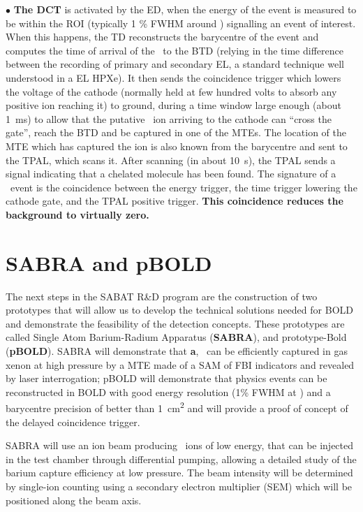 \documentclass[a4paper,11pt]{article}
\begin{document}
$\bullet$ \textbf{The DCT} is activated by the ED, when the energy of the event is measured to be within the ROI (typically 1 \% FWHM around \Qbb) signalling an event of interest. When this happens, the TD reconstructs the barycentre of the event and computes the time of arrival of the \Bapp\ to the BTD (relying in the time difference between the recording of primary and secondary EL, a standard technique well understood in a EL HPXe). It then sends the coincidence trigger which lowers the voltage of the cathode (normally held at few hundred volts to absorb any positive ion reaching it) to ground, during a time window large enough (about \SI{1}{ms}) to allow that the putative \Bapp\ ion arriving to the cathode can ``cross the gate'', reach the BTD and be captured in one of the MTEs. The location of the MTE which has captured the ion is also known from the barycentre and sent to the TPAL, which scans it. After scanning (in about 
\SI{10}{\second}), the TPAL sends a signal indicating that a chelated molecule has been found. The signature of a \bbonu\ event is the coincidence between the energy trigger, the time trigger lowering the cathode gate, and the TPAL positive trigger.  {\bf This coincidence reduces the background to virtually zero. }

\section{SABRA and pBOLD}


The next steps in the SABAT R\&D program are the construction of two prototypes that will allow us to develop the technical solutions needed for BOLD and demonstrate the feasibility of the detection concepts. These prototypes are called Single Atom Barium-Radium Apparatus (\textbf{SABRA}), and prototype-Bold (\textbf{pBOLD}). SABRA will demonstrate that \textbf{a}, \Bapp\ can be efficiently captured in gas xenon at high pressure by a MTE made of a SAM of FBI indicators and revealed by laser interrogation; pBOLD will demonstrate that physics events can be reconstructed in BOLD with good energy resolution (1\% FWHM at \Qbb) and a barycentre precision of better than \SI{1}{cm^2} and will provide a proof of concept of the delayed coincidence trigger.  

SABRA will use an ion beam producing \Bapp\ ions of low energy, that can be injected in the test chamber through differential pumping, allowing a detailed study of the barium capture efficiency at low pressure. The beam intensity will be determined by single-ion counting using a secondary electron multiplier (SEM) which will be positioned along the beam axis. 
\end{document}

